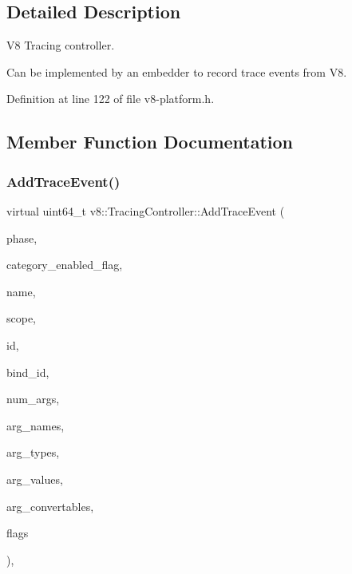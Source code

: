 \subsection{Detailed Description}
V8 Tracing controller.

Can be implemented by an embedder to record trace events from V8. 

Definition at line 122 of file v8-\/platform.\+h.



\subsection{Member Function Documentation}
\mbox{\label{classv8_1_1TracingController_ad1e234b340ea8f9f1e3386aa21dad5dd}} 
\subsubsection{\texorpdfstring{Add\+Trace\+Event()}{AddTraceEvent()}}
{\footnotesize\ttfamily virtual uint64\+\_\+t v8\+::\+Tracing\+Controller\+::\+Add\+Trace\+Event (\begin{DoxyParamCaption}\item[{\mbox{\hyperlink{classchar}{char}}}]{phase,  }\item[{const uint8\+\_\+t $\ast$}]{category\+\_\+enabled\+\_\+flag,  }\item[{const \mbox{\hyperlink{classchar}{char}} $\ast$}]{name,  }\item[{const \mbox{\hyperlink{classchar}{char}} $\ast$}]{scope,  }\item[{uint64\+\_\+t}]{id,  }\item[{uint64\+\_\+t}]{bind\+\_\+id,  }\item[{int32\+\_\+t}]{num\+\_\+args,  }\item[{const \mbox{\hyperlink{classchar}{char}} $\ast$$\ast$}]{arg\+\_\+names,  }\item[{const uint8\+\_\+t $\ast$}]{arg\+\_\+types,  }\item[{const uint64\+\_\+t $\ast$}]{arg\+\_\+values,  }\item[{std\+::unique\+\_\+ptr$<$ \mbox{\hyperlink{classv8_1_1ConvertableToTraceFormat}{Convertable\+To\+Trace\+Format}} $>$ $\ast$}]{arg\+\_\+convertables,  }\item[{\mbox{\hyperlink{classunsigned}{unsigned}} \mbox{\hyperlink{classint}{int}}}]{flags }\end{DoxyParamCaption})\hspace{0.3cm}{\ttfamily [inline]}, {\ttfamily [virtual]}}

